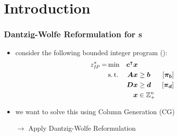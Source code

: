 \documentclass[compress,beamer,aspectratio=169,english,usenames,dvipsnames]{beamer}
\title{\courseTitle}
\author{Til Mohr}
\begin{document}
\begin{frame}[plain]
\title{\courseTitle}
\subtitle{\exerciseTopic}
\author{\textbf{Til Mohr}\newline
	\url{til.mohr@rwth-aachen.de}\smallskip\smallskip\newline
	Master thesis at the \newline
	Chair of Operations Research @ RWTH Aachen\newline
	\url{www.or.rwth-aachen.de}\smallskip\newline
}
\date{September 19, 2024}
\titlepage
\end{frame}

\nocite{*}

\section{Introduction}
\begin{frame}
\frametitle{Dantzig-Wolfe Reformulation for \IP{}s}
\begin{itemize}
\item	consider the following bounded integer program (\IP{}):
		\begin{equation*}
		\begin{aligned}
		z^*_{\textit{IP}}{} = &\min & {\bm{c}}^\intercal {\bm{x}} & & & \\
		&\operatorname{s.t.} & {\bm{A}} {\bm{x}} & \geq {\bm{b}} & \left[{\bm{\pi}}_{\bm{b}}\right] & \\
		&& {\bm{D}} {\bm{x}} & \geq {\bm{d}} & \left[{\bm{\pi}}_{\bm{d}}\right] & \\
		&& {\bm{x}} & \in \mathbb{Z}_ +^n
		\end{aligned}
		\end{equation*}
\item	we want to solve this \IP{} using Column Generation (CG)
\pause
\item[$\rightarrow$]	Apply Dantzig-Wolfe Reformulation
\end{itemize}
\end{frame}
\end{document}
